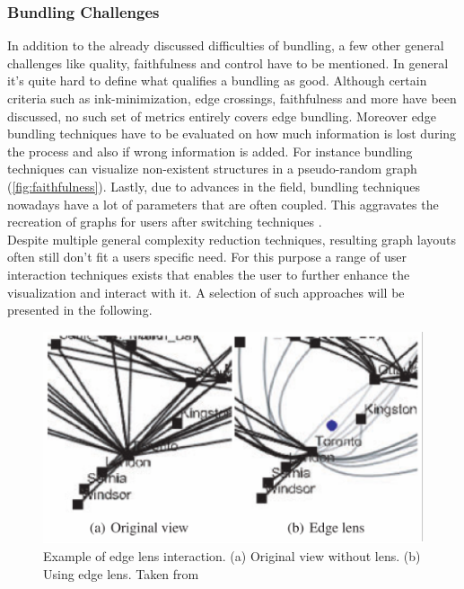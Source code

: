 \subsubsection{Bundling Challenges}
In addition to the already discussed difficulties of bundling, a few other general challenges like quality, faithfulness and control have to be mentioned.
In general it's quite hard to define what qualifies a bundling as good. Although certain criteria such as ink-minimization, edge crossings, faithfulness and more have been discussed, no such set of metrics entirely covers edge bundling\cite{Lhuillier2017}. 
Moreover edge bundling techniques have to be evaluated on how much information is lost during the process and also if wrong information is added. For instance bundling techniques can visualize non-existent structures in a pseudo-random graph (\autoref{fig:faithfulness}).
Lastly, due to advances in the field, bundling techniques nowadays have a lot of parameters that are often coupled. This aggravates the recreation of graphs for users after switching techniques \cite{Lhuillier2017}.\\
Despite multiple general complexity reduction techniques, resulting graph layouts often still don't fit a users specific need. 
For this purpose a range of user interaction techniques exists that enables the user to further enhance the visualization and interact with it. A selection of such approaches will be presented in the following. 

\begin{figure}
    \centering
    \includegraphics[scale=0.8]{media/edge_lense.pdf}
    \caption{Example of edge lens interaction. (a) Original view without lens. (b) Using edge lens. Taken from \cite{VonLandesberger2011}}
    \label{fig:edge_lense}
\end{figure}
